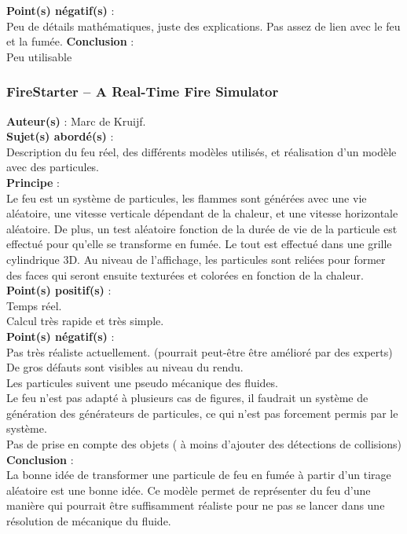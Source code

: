 \documentclass[a4paper,10pt]{article}
\begin{document}
\textbf{Point(s) négatif(s)} :\\
	Peu de détails mathématiques, juste des explications.
	Pas assez de lien avec le feu et la fumée.
\textbf{Conclusion} :\\
	Peu utilisable





\subsubsection{FireStarter – A Real-Time Fire Simulator}
\textbf{Auteur(s)} : Marc de Kruijf.\\
\textbf{Sujet(s) abordé(s)} : \\ 
	Description du feu réel, des différents modèles utilisés, et réalisation d'un modèle avec des particules.\\
\textbf{Principe} :\\	
	Le feu est un système de particules, les flammes sont générées avec une vie aléatoire, une vitesse verticale dépendant de la chaleur, et une vitesse horizontale aléatoire. De plus, un test aléatoire fonction de la durée de vie de la particule est effectué pour qu'elle se transforme en fumée. Le tout est effectué dans une grille cylindrique 3D. Au niveau de l'affichage, les particules sont reliées pour former des faces qui seront ensuite texturées et colorées en fonction de la chaleur.\\
\textbf{Point(s) positif(s)} :\\
	Temps réel.\\
	Calcul très rapide et très simple.\\
\textbf{Point(s) négatif(s)} :\\
	Pas très réaliste actuellement. (pourrait peut-être être amélioré par des experts)\\
	De gros défauts sont visibles au niveau du rendu.\\
	Les particules suivent une pseudo mécanique des fluides.\\
	Le feu n'est pas adapté à plusieurs cas de figures, il faudrait un système de génération des générateurs de particules, ce qui n'est pas forcement permis par le système.\\
	Pas de prise en compte des objets ( à moins d'ajouter des détections de collisions)
\textbf{Conclusion} :\\
	La bonne idée de transformer une particule de feu en fumée à partir d'un tirage aléatoire est une bonne idée. Ce modèle permet de représenter du feu d'une manière qui pourrait être suffisamment réaliste pour ne pas se lancer dans une résolution de mécanique du fluide.\\
\end{document}
